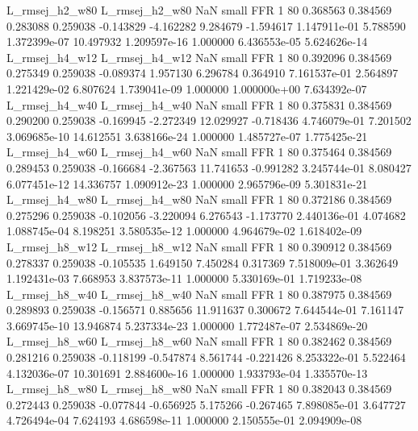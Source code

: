 L_rmsej_h2_w80 L_rmsej_h2_w80                   NaN      small      FFR                 1 80 0.368563       0.384569 0.283088       0.259038   -0.143829     -4.162282      9.284679    -1.594617   1.147911e-01  5.788590 1.372399e-07    10.497932   1.209597e-16            1.000000    6.436553e-05        5.624626e-14
L_rmsej_h4_w12 L_rmsej_h4_w12                   NaN      small      FFR                 1 80 0.392096       0.384569 0.275349       0.259038   -0.089374      1.957130      6.296784     0.364910   7.161537e-01  2.564897 1.221429e-02     6.807624   1.739041e-09            1.000000    1.000000e+00        7.634392e-07
L_rmsej_h4_w40 L_rmsej_h4_w40                   NaN      small      FFR                 1 80 0.375831       0.384569 0.290200       0.259038   -0.169945     -2.272349     12.029927    -0.718436   4.746079e-01  7.201502 3.069685e-10    14.612551   3.638166e-24            1.000000    1.485727e-07        1.775425e-21
L_rmsej_h4_w60 L_rmsej_h4_w60                   NaN      small      FFR                 1 80 0.375464       0.384569 0.289453       0.259038   -0.166684     -2.367563     11.741653    -0.991282   3.245744e-01  8.080427 6.077451e-12    14.336757   1.090912e-23            1.000000    2.965796e-09        5.301831e-21
L_rmsej_h4_w80 L_rmsej_h4_w80                   NaN      small      FFR                 1 80 0.372186       0.384569 0.275296       0.259038   -0.102056     -3.220094      6.276543    -1.173770   2.440136e-01  4.074682 1.088745e-04     8.198251   3.580535e-12            1.000000    4.964679e-02        1.618402e-09
L_rmsej_h8_w12 L_rmsej_h8_w12                   NaN      small      FFR                 1 80 0.390912       0.384569 0.278337       0.259038   -0.105535      1.649150      7.450284     0.317369   7.518009e-01  3.362649 1.192431e-03     7.668953   3.837573e-11            1.000000    5.330169e-01        1.719233e-08
L_rmsej_h8_w40 L_rmsej_h8_w40                   NaN      small      FFR                 1 80 0.387975       0.384569 0.289893       0.259038   -0.156571      0.885656     11.911637     0.300672   7.644544e-01  7.161147 3.669745e-10    13.946874   5.237334e-23            1.000000    1.772487e-07        2.534869e-20
L_rmsej_h8_w60 L_rmsej_h8_w60                   NaN      small      FFR                 1 80 0.382462       0.384569 0.281216       0.259038   -0.118199     -0.547874      8.561744    -0.221426   8.253322e-01  5.522464 4.132036e-07    10.301691   2.884600e-16            1.000000    1.933793e-04        1.335570e-13
L_rmsej_h8_w80 L_rmsej_h8_w80                   NaN      small      FFR                 1 80 0.382043       0.384569 0.272443       0.259038   -0.077844     -0.656925      5.175266    -0.267465   7.898085e-01  3.647727 4.726494e-04     7.624193   4.686598e-11            1.000000    2.150555e-01        2.094909e-08
